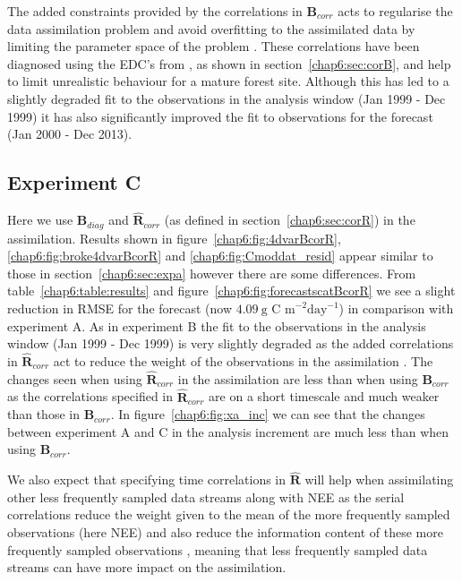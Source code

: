 The added constraints provided by the correlations in $\textbf{B}_{corr}$ acts to regularise the data assimilation problem and avoid overfitting to the assimilated data by limiting the parameter space of the problem \citep{smith2009variational}. These correlations have been diagnosed using the EDC's from \citet{Bloom2015}, as shown in section~\ref{chap6:sec:corB}, and help to limit unrealistic behaviour for a mature forest site. Although this has led to a slightly degraded fit to the observations in the analysis window (Jan 1999 - Dec 1999) it has also significantly improved the fit to observations for the forecast (Jan 2000 - Dec 2013).

\subsection{Experiment C} \label{chap6:sec:expc}

Here we use $\textbf{B}_{diag}$ and $\hat{\textbf{R}}_{corr}$ (as defined in section~\ref{chap6:sec:corR}) in the assimilation. Results shown in figure~\ref{chap6:fig:4dvarBcorR}, \ref{chap6:fig:broke4dvarBcorR} and \ref{chap6:fig:Cmoddat_resid} appear similar to those in section~\ref{chap6:sec:expa} however there are some differences. From table~\ref{chap6:table:results} and figure~\ref{chap6:fig:forecastscatBcorR} we see a slight reduction in RMSE for the forecast (now $4.09 ~\text{g C m}^{-2}\text{day}^{-1}$) in comparison with experiment A. As in experiment B the fit to the observations in the analysis window (Jan 1999 - Dec 1999) is very slightly degraded as the added correlations in $\hat{\textbf{R}}_{corr}$ act to reduce the weight of the observations in the assimilation \citep{jarvinen1999variational}. The changes seen when using $\hat{\textbf{R}}_{corr}$ in the assimilation are less than when using $\textbf{B}_{corr}$ as the correlations specified in $\hat{\textbf{R}}_{corr}$ are on a short timescale and much weaker than those in $\textbf{B}_{corr}$. In figure~\ref{chap6:fig:xa_inc} we can see that the changes between experiment A and C in the analysis increment are much less than when using $\textbf{B}_{corr}$.  

We also expect that specifying time correlations in $\hat{\textbf{R}}$ will help when assimilating other less frequently sampled data streams along with NEE as the serial correlations reduce the weight given to the mean of the more frequently sampled observations (here NEE) and also reduce the information content of these more frequently sampled observations \citep{jarvinen1999variational, Daley1992}, meaning that less frequently sampled data streams can have more impact on the assimilation.

